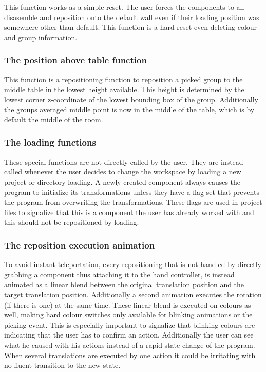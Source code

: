 \documentclass[hyperref,english,bachelorofscience,bibnum]{cgvpub}
\begin{document}
This function works as a simple reset. The user forces the components to all disasemble and reposition onto the default wall even if their loading position was somewhere other than default. This function is a hard reset even deleting colour and group information.

\subsubsection{The position above table function}

This function is a repositioning function to reposition a picked group to the middle table in the lowest height available. This height is determined by the lowest corner z-coordinate of the lowest bounding box of the group. Additionally the groups averaged middle point is now in the middle of the table, which is by default the middle of the room.

\subsubsection{The loading functions}

These special functions are not directly called by the user. They are instead called whenever the user decides to change the workspace by loading a new project or directory loading. A newly created component always causes the program to initialize its transformations unless they have a flag set that prevents the program from overwriting the transformations. These flags are used in project files to signalize that this is a component the user has already worked with and this should not be repositioned by loading. 

\subsubsection{The reposition execution animation}

To avoid instant teleportation, every repositioning that is not handled by directly grabbing a component thus attaching it to the hand controller, is instead animated as a linear blend between the original translation position and the target translation position. Additionally a second animation executes the rotation (if there is one) at the same time.
These linear blend is executed on colours as well, making hard colour switches only available for blinking animations or the picking event. This is especially important to signalize that blinking colours are indicating that the user has to confirm an action. Additionally the user can see what he caused with his actions instead of a rapid state change of the program. When several translations are executed by one action it could be irritating with no fluent transition to the new state.%
\end{document}
